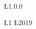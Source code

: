 \begin{center}
\begin{bfseries}
\bigskip
\bigskip

 \L{1.0.0} 

\bigskip

\L{1}  \L{2019} 
\end{bfseries}
\end{center}

